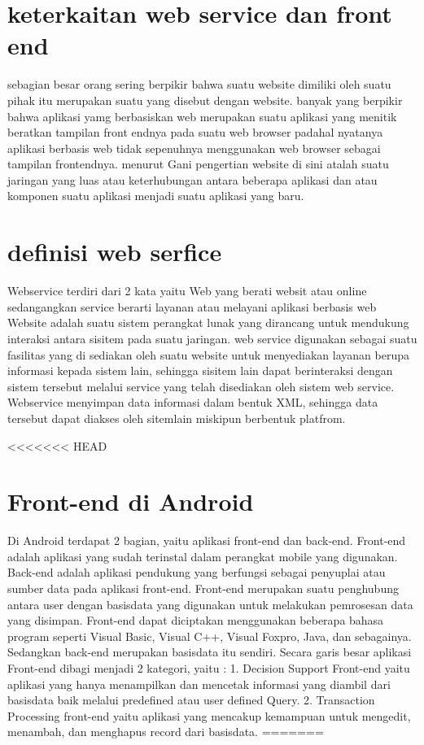 \section{keterkaitan web service dan front end }
sebagian besar orang sering berpikir bahwa suatu website dimiliki oleh suatu pihak 
itu merupakan suatu yang disebut dengan website. banyak yang berpikir bahwa aplikasi yamg berbasiskan 
web merupakan suatu aplikasi yang menitik beratkan tampilan front endnya pada suatu web browser 
padahal nyatanya aplikasi berbasis web tidak sepenuhnya menggunakan web browser sebagai tampilan 
frontendnya. menurut Gani pengertian website di sini atalah suatu jaringan yang luas atau keterhubungan 
antara beberapa aplikasi dan atau komponen suatu aplikasi menjadi suatu aplikasi yang baru.

\section{definisi web serfice }
Webservice terdiri dari 2 kata yaitu Web yang berati websit atau online 
sedangangkan service berarti layanan atau melayani aplikasi berbasis web 
Website adalah suatu sistem perangkat lunak yang dirancang untuk mendukung interaksi antara sisitem pada suatu jaringan.
web service digunakan sebagai suatu fasilitas yang di sediakan oleh suatu website untuk menyediakan layanan berupa informasi kepada 
sistem lain, sehingga sisitem lain dapat berinteraksi dengan sistem tersebut melalui service yang telah disediakan oleh sistem web service.
Webservice menyimpan data informasi dalam bentuk XML, sehingga data tersebut dapat diakses oleh sitemlain miskipun berbentuk platfrom. 

<<<<<<< HEAD
\section{Front-end di Android }
Di Android terdapat 2 bagian, yaitu aplikasi front-end dan back-end. Front-end adalah aplikasi yang sudah terinstal dalam perangkat mobile yang digunakan.
Back-end adalah aplikasi pendukung yang berfungsi sebagai penyuplai atau sumber data pada aplikasi front-end. Front-end merupakan suatu penghubung
antara user dengan basisdata yang digunakan untuk melakukan pemrosesan data yang disimpan. Front-end dapat diciptakan menggunakan 
beberapa bahasa program seperti Visual Basic, Visual C++, Visual Foxpro, Java, dan sebagainya. Sedangkan back-end merupakan basisdata itu sendiri.
 Secara garis besar aplikasi Front-end dibagi menjadi 2 kategori, yaitu :
1. Decision Support Front-end yaitu aplikasi yang hanya menampilkan  dan mencetak informasi yang diambil dari basisdata baik melalui predefined atau user defined Query.
2. Transaction Processing front-end yaitu aplikasi yang mencakup kemampuan untuk mengedit, menambah, dan menghapus record dari basisdata.
=======
